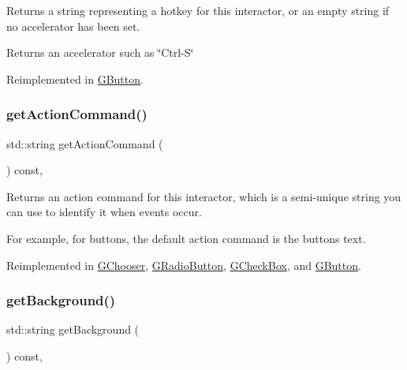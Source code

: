 Returns a string representing a hotkey for this interactor, or an empty string if no accelerator has been set. 

\begin{DoxyReturn}{Returns}
an accelerator such as \char`\"{}\+Ctrl-\/\+S\char`\"{} 
\end{DoxyReturn}


Reimplemented in \mbox{\hyperlink{classGButton_a432ca43c59ffb2adc9cb66d43621bc27}{G\+Button}}.

\mbox{\label{classGInteractor_a94eb4276000c4fdfb508ce9e6317a82a}} 
\subsubsection{\texorpdfstring{get\+Action\+Command()}{getActionCommand()}}
{\footnotesize\ttfamily std\+::string get\+Action\+Command (\begin{DoxyParamCaption}{ }\end{DoxyParamCaption}) const\hspace{0.3cm}{\ttfamily [virtual]}, {\ttfamily [inherited]}}



Returns an action command for this interactor, which is a semi-\/unique string you can use to identify it when events occur. 

For example, for buttons, the default action command is the button\textquotesingle{}s text. 

Reimplemented in \mbox{\hyperlink{classGChooser_a90f2b1e6f6e7dabd9d6e5307f7c6d1b7}{G\+Chooser}}, \mbox{\hyperlink{classGRadioButton_a90f2b1e6f6e7dabd9d6e5307f7c6d1b7}{G\+Radio\+Button}}, \mbox{\hyperlink{classGCheckBox_a90f2b1e6f6e7dabd9d6e5307f7c6d1b7}{G\+Check\+Box}}, and \mbox{\hyperlink{classGButton_a90f2b1e6f6e7dabd9d6e5307f7c6d1b7}{G\+Button}}.

\mbox{\label{classGInteractor_a808e22cc1fdfbecf71ed8c64ef4600e0}} 
\subsubsection{\texorpdfstring{get\+Background()}{getBackground()}}
{\footnotesize\ttfamily std\+::string get\+Background (\begin{DoxyParamCaption}{ }\end{DoxyParamCaption}) const\hspace{0.3cm}{\ttfamily [virtual]}, {\ttfamily [inherited]}}



